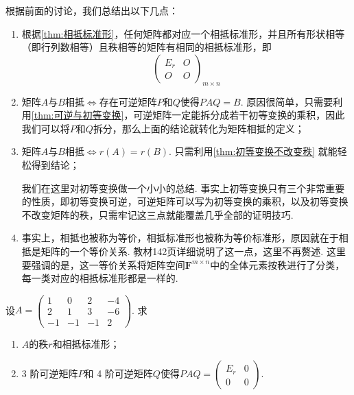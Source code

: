 根据前面的讨论，我们总结出以下几点：
\begin{enumerate}
    \item 根据\autoref{thm:相抵标准形}，任何矩阵都对应一个相抵标准形，并且所有形状相等（即行列数相等）且秩相等的矩阵有相同的相抵标准形，即\[\begin{pmatrix}
                  E_r & O \\ O & O
              \end{pmatrix}_{m\times n}\]

    \item 矩阵$A$与$B$相抵$\iff$存在可逆矩阵$P$和$Q$使得$PAQ=B$. 原因很简单，只需要利用\autoref{thm:可逆与初等变换}，可逆矩阵一定能拆分成若干初等变换的乘积，因此我们可以将$P$和$Q$拆分，那么上面的结论就转化为矩阵相抵的定义；

    \item 矩阵$A$与$B$相抵$\iff r(A)=r(B)$. 只需利用\autoref{thm:初等变换不改变秩} 就能轻松得到结论；

          我们在这里对初等变换做一个小小的总结. 事实上初等变换只有三个非常重要的性质，即初等变换可逆，可逆矩阵可以写为初等变换的乘积，以及初等变换不改变矩阵的秩，只需牢记这三点就能覆盖几乎全部的证明技巧.

    \item 事实上，相抵也被称为等价，相抵标准形也被称为等价标准形，原因就在于相抵是矩阵的一个等价关系. 教材142页详细说明了这一点，这里不再赘述. 这里要强调的是，这一等价关系将矩阵空间$\mathbf{F}^{m\times n}$中的全体元素按秩进行了分类，每一类对应的相抵标准形都是一样的.
\end{enumerate}

\begin{example}{}{}
    设$A=\begin{pmatrix}
            1 & 0 & 2 & -4 \\ 2 & 1 & 3 & -6 \\ -1 & -1 & -1 & 2
        \end{pmatrix}$. 求
    \begin{enumerate}[label=(\arabic*)]
        \item $A$的秩$r$和相抵标准形；

        \item
              3 阶可逆矩阵$P$和 4 阶可逆矩阵$Q$使得$PAQ=\begin{pmatrix}
                      E_r & 0 \\ 0 & 0
                  \end{pmatrix}$.
    \end{enumerate}
\end{example}

